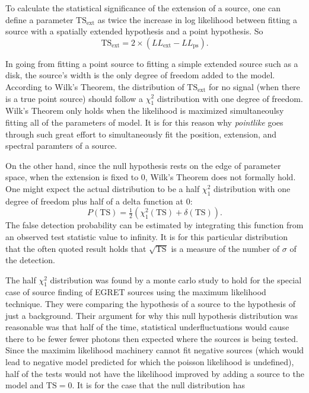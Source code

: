 \documentclass[preprint]{aastex}
\newcommand{\tsext}{\ensuremath{\text{TS}_\text{ext}}\xspace}
\newcommand{\ts}{\text{TS}\xspace}
\newcommand{\pointlike}{{\em pointlike}\xspace}
\begin{document}
To calculate the statistical significance of the extension of a source,
one can define a parameter $\tsext$ as twice the increase
in log likelihood between fitting a source with a
spatially extended hypothesis and a point hypothesis. 
So 
\begin{equation}
  \tsext=2\times(LL_\text{ext}-LL_\text{ps}).
\end{equation}

In going from fitting a point source to fitting a simple extended source such as
a disk, the source's width is the only degree of freedom added to the model. According to
Wilk's Theorem, the distribution of $\tsext$ for no signal (when there is a true
point source) should follow a $\chi^2_1$ distribution with one degree of freedom\cite{Wilks_Theorem}.
Wilk's Theorem only holds when the likelihood is maximized simultaneoulsy
fitting all of the parameters of model. It is for this reason why 
\pointlike
goes through such great effort to simultaneously fit the position, extension,
and spectral paramters of a source.

On the other hand, since the null hypothesis rests on the edge of
parameter space, when the extension is fixed to 0, Wilk's Theorem does
not formally hold\cite{Warnings about Wilk's Theorem Paper}.  One might
expect the actual distribution to be a half $\chi^2_1$ distribution with
one degree of freedom plus half of a delta function at 0:
\begin{equation}
  P(\ts)=\tfrac{1}{2}(\chi^2_1(\ts)+\delta(\ts)).
\end{equation}
The false detection probability can be estimated by integrating this function 
from an observed test statistic value to infinity. It is for this
particular distribution that the often quoted result holds that
$\sqrt{\ts}$ is a measure of the number of $\sigma$ of the detection.

The half $\chi^2_1$ distribution was found by a monte carlo study
to hold for the special case of source finding of EGRET sources using the
maximum likelihood technique.  They were comparing the hypothesis of a
source to the hypothesis of just a background\cite{Mattox_et_All_Paper}.
Their argument for why this null hypothesis distribution was reasonable
was that half of the time, statistical underfluctuations would cause
there to be fewer fewer photons then expected where the sources is being
tested. Since the maximim likelihood machinery cannot fit negative
sources (which would lead to negative model predicted for which the
poisson likelihood is undefined), half of the tests would not have the
likelihood improved by adding a source to the model and $\ts=0$.
It is for the case that the null distribution has 
\end{document}

